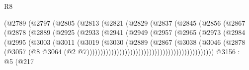 \begin{lexlean}{R8}
\begin{coremodule}
                                (@2789
                                  (@2797
                                    (@2805
                                      (@2813
                                        (@2821
                                          (@2829
                                            (@2837
                                              (@2845
                                                (@2856
                                                  (@2867
                                                    (@2878
                                                      (@2889
                                                        (@2925
                                                          (@2933
                                                            (@2941
                                                              (@2949
                                                                (@2957
                                                                  (@2965
                                                                    (@2973
                                                                      (@2984
                                                                        (@2995
                                                                          (@3003
                                                                            (@3011
                                                                              (@3019
                                                                                (@3030
                                                                                  (@2889
                                                                                    (@2867
                                                                                      (@3038
                                                                                        (@3046
                                                                                          (@2878
                                                                                            (@3057
                                                                                              (@8
                                                                                                @3064
                                                                                                (@2
                                                                                                  @7)))))))))))))))))))))))))))))))))))))))))))))))
@3156 := @5
    (@217

\end{coremodule}
\end{lexlean}
